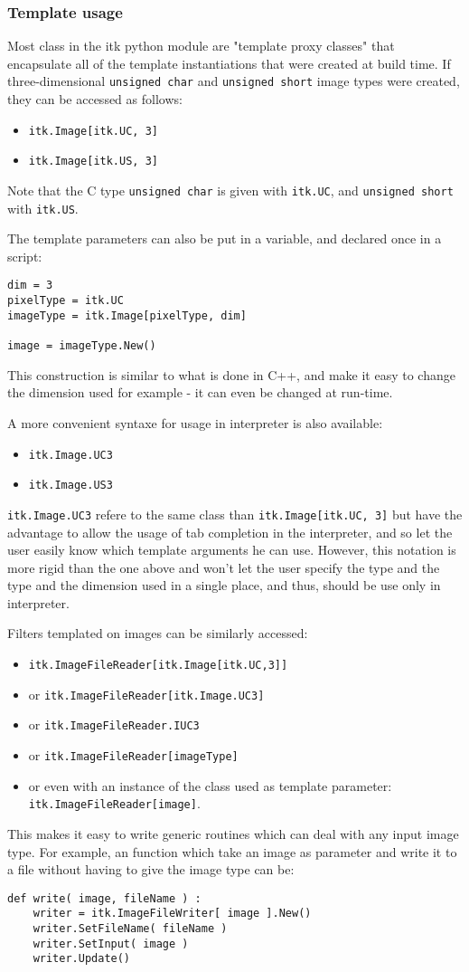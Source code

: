 \documentclass{InsightArticle}
\begin{document}
     \subsubsection{Template usage}
Most class in the itk python module are "template proxy classes" that
encapsulate all of the template instantiations that were created at build time.
If three-dimensional \verb$unsigned char$ and \verb$unsigned short$ image types were created,
they can be accessed as follows:
\begin{itemize}
  \item \verb$itk.Image[itk.UC, 3]$
  \item \verb$itk.Image[itk.US, 3]$
\end{itemize}
Note that the C type \verb$unsigned char$ is given with \verb$itk.UC$, and \verb$unsigned short$
with \verb$itk.US$.

The template parameters can also be put in a variable, and declared once
in a script:
\begin{verbatim}
dim = 3
pixelType = itk.UC
imageType = itk.Image[pixelType, dim]

image = imageType.New()
\end{verbatim}
This construction is similar to what is done in C++, and make it easy to change
the dimension used for example - it can even be changed at run-time.

A more convenient syntaxe for usage in interpreter is also available:
\begin{itemize}
  \item \verb$itk.Image.UC3$
  \item \verb$itk.Image.US3$
\end{itemize}
\verb$itk.Image.UC3$ refere to the same class than \verb$itk.Image[itk.UC, 3]$
but have the advantage to allow the usage of tab completion in the interpreter,
and so let the user easily know which template arguments he can use.
However, this notation is more rigid than the one above and won't let the user
specify the type and the type and the dimension used in a single place, and thus,
should be use only in interpreter.


Filters templated on images can be similarly accessed:
\begin{itemize}
  \item \verb$itk.ImageFileReader[itk.Image[itk.UC,3]]$
  \item or \verb$itk.ImageFileReader[itk.Image.UC3]$
  \item or \verb$itk.ImageFileReader.IUC3$
  \item or \verb$itk.ImageFileReader[imageType]$
  \item or even with an instance of the class used as template parameter: \verb$itk.ImageFileReader[image]$.
\end{itemize}
This makes it easy to write generic routines which
can deal with any input image type. For example, an function which take an image
as parameter and write it to a file without having to give the image type can be:
\begin{verbatim}
def write( image, fileName ) :
    writer = itk.ImageFileWriter[ image ].New()
    writer.SetFileName( fileName )
    writer.SetInput( image )
    writer.Update()
\end{verbatim}
\end{document}
